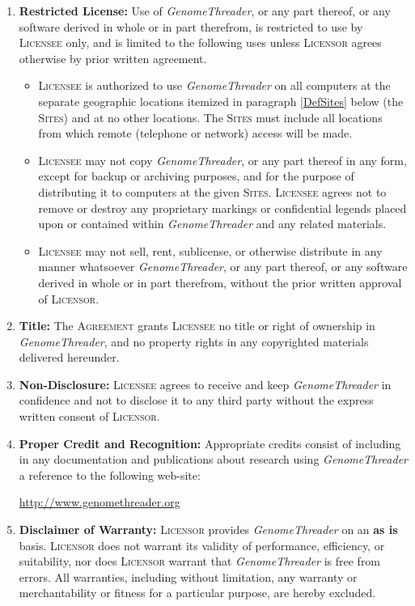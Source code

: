 \documentclass[12pt]{article}
\newcommand{\Software}[0]{\emph{GenomeThreader}\xspace}
\newcommand{\Thepaper}[0]{web-site: \par\url{http://www.genomethreader.org}\xspace}
\newcommand{\Licensor}[0]{\textsc{Licensor}\xspace}
\newcommand{\Licensee}[0]{\textsc{Licensee}\xspace}
\newcommand{\Agreement}[0]{\textsc{Agreement}\xspace}
\newcommand{\Sites}[0]{\textsc{Sites}\xspace}
\newcommand{\Paragraph}[2]{\item \textbf{#1:} #2}
\begin{document}
\begin{enumerate}

\Paragraph{Restricted License}{Use of \Software, or any part 
thereof, or any software derived in whole or in part therefrom, is 
restricted to use by \Licensee only, and is limited to the following 
uses unless \Licensor agrees otherwise by prior written agreement.
}

\begin{itemize}
\item
\Licensee is authorized to use \Software on all computers 
at the separate geographic locations itemized in paragraph \ref{DefSites} below 
(the \Sites) and at no other locations. The \Sites must include all 
locations from which remote (telephone or network) access will be 
made.
\item
\Licensee may not copy \Software, or any part thereof in 
any form, except for backup or archiving purposes, and for the 
purpose of distributing it to computers at the given \Sites. \Licensee 
agrees not to remove or destroy any proprietary markings or 
confidential legends placed upon or contained within \Software 
and any related materials.
\item
\Licensee may not sell, rent, sublicense, or otherwise distribute 
in any manner whatsoever \Software, or any part thereof, or 
any software derived in whole or in part therefrom, without the prior 
written approval of \Licensor.
\end{itemize}

\Paragraph{Title}{The \Agreement grants \Licensee no title or right of 
ownership in \Software, and no property rights in any 
copyrighted materials delivered hereunder.
}

\Paragraph{Non-Disclosure}{\Licensee agrees to receive and keep 
\Software in confidence and not to disclose it to any third 
party without the express written consent of \Licensor.
}

\Paragraph{Proper Credit and Recognition}{Appropriate credits consist 
of including in any documentation and publications about research 
using \Software a reference to the following \Thepaper
}

\Paragraph{Disclaimer of Warranty}{\Licensor provides \Software 
on an \textbf{as is} basis. \Licensor does not warrant its validity of 
performance, efficiency, or suitability, nor does \Licensor warrant 
that \Software is free from errors. All warranties, 
including without limitation, any warranty or merchantability or 
fitness for a particular purpose, are hereby excluded.
}


\end{enumerate}
\end{document}
